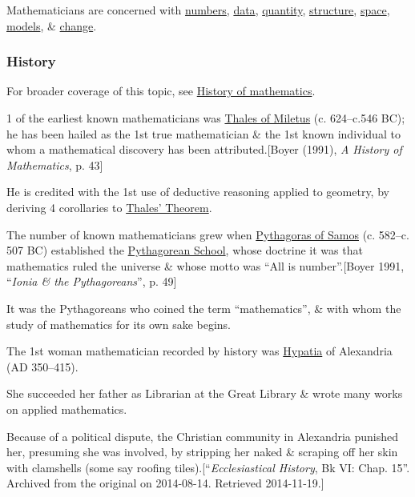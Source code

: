 \documentclass{article}
\begin{document}
Mathematicians are concerned with \href{https://en.wikipedia.org/wiki/Number}{numbers}, \href{https://en.wikipedia.org/wiki/Data}{data}, \href{https://en.wikipedia.org/wiki/Quantity}{quantity}, \href{https://en.wikipedia.org/wiki/Mathematical_structure}{structure}, \href{https://en.wikipedia.org/wiki/Space}{space}, \href{https://en.wikipedia.org/wiki/Mathematical_model}{models}, \& \href{https://en.wikipedia.org/wiki/Mathematics#Change}{change}.

\subsubsection{History}
For broader coverage of this topic, see \href{https://en.wikipedia.org/wiki/History_of_mathematics}{History of mathematics}.

%
1 of the earliest known mathematicians was \href{https://en.wikipedia.org/wiki/Thales_of_Miletus}{Thales of Miletus} (c. 624--c.546 BC); he has been hailed as the 1st true mathematician \& the 1st known individual to whom a mathematical discovery has been attributed.[Boyer (1991), \textit{A History of Mathematics}, p. 43]

He is credited with the 1st use of deductive reasoning applied to geometry, by deriving 4 corollaries to \href{https://en.wikipedia.org/wiki/Thales%27_Theorem}{Thales' Theorem}.

%
The number of known mathematicians grew when \href{https://en.wikipedia.org/wiki/Pythagoras_of_Samos}{Pythagoras of Samos} (c. 582--c. 507 BC) established the \href{https://en.wikipedia.org/wiki/Pythagoreans}{Pythagorean School}, whose doctrine it was that mathematics ruled the universe \& whose motto was ``All is number''.[Boyer 1991, ``\textit{Ionia \& the Pythagoreans}'', p. 49]

It was the Pythagoreans who coined the term ``mathematics'', \& with whom the study of mathematics for its own sake begins.

%
The 1st woman mathematician recorded by history was \href{https://en.wikipedia.org/wiki/Hypatia}{Hypatia} of Alexandria (AD 350--415).

She succeeded her father as Librarian at the Great Library \& wrote many works on applied mathematics.

Because of a political dispute, the Christian community in Alexandria punished her, presuming she was involved, by stripping her naked \& scraping off her skin with clamshells (some say roofing tiles).[``\textit{Ecclesiastical History}, Bk VI: Chap. 15''. Archived from the original on 2014-08-14. Retrieved 2014-11-19.]
\end{document}
